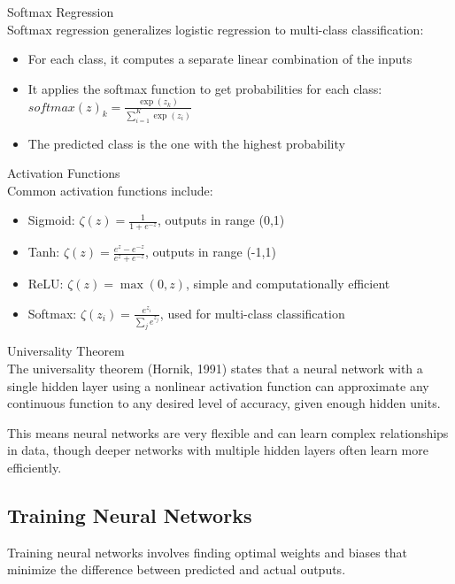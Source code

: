 \begin{definition}{Softmax Regression}\\
Softmax regression generalizes logistic regression to multi-class classification:
\begin{itemize}
    \item For each class, it computes a separate linear combination of the inputs
    \item It applies the softmax function to get probabilities for each class: $softmax(z)_k = \frac{\exp(z_k)}{\sum_{i=1}^{K} \exp(z_i)}$
    \item The predicted class is the one with the highest probability
\end{itemize}
\end{definition}

\begin{definition}{Activation Functions}\\
Common activation functions include:
\begin{itemize}
    \item Sigmoid: $\zeta(z) = \frac{1}{1 + e^{-z}}$, outputs in range (0,1)
    \item Tanh: $\zeta(z) = \frac{e^z - e^{-z}}{e^z + e^{-z}}$, outputs in range (-1,1)
    \item ReLU: $\zeta(z) = \max(0, z)$, simple and computationally efficient
    \item Softmax: $\zeta(z_i) = \frac{e^{z_i}}{\sum_{j} e^{z_j}}$, used for multi-class classification
\end{itemize}
\end{definition}

\begin{concept}{Universality Theorem}\\
The universality theorem (Hornik, 1991) states that a neural network with a single hidden layer using a nonlinear activation function can approximate any continuous function to any desired level of accuracy, given enough hidden units.

This means neural networks are very flexible and can learn complex relationships in data, though deeper networks with multiple hidden layers often learn more efficiently.
\end{concept}

\subsection{Training Neural Networks}

Training neural networks involves finding optimal weights and biases that minimize the difference between predicted and actual outputs.

